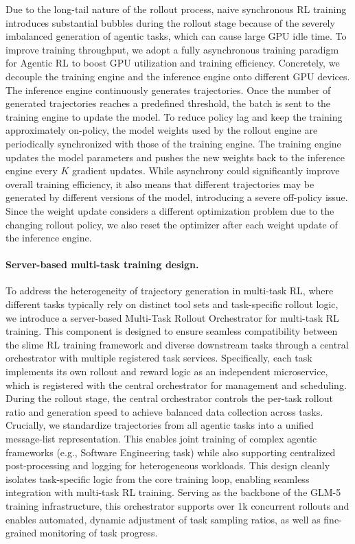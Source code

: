 Due to the long-tail nature of the rollout process, naive synchronous RL training introduces substantial bubbles during the rollout stage because of the severely imbalanced generation of agentic tasks, which can cause large GPU idle time. 
To improve training throughput, we adopt a fully asynchronous training paradigm for Agentic RL to boost GPU utilization and training efficiency.
Concretely, we decouple the training engine and the inference engine onto different GPU devices. 
The inference engine continuously generates trajectories. Once the number of generated trajectories reaches a predefined threshold, the batch is sent to the training engine to update the model.
To reduce policy lag and keep the training approximately on-policy, the model weights used by the rollout engine are periodically synchronized with those of the training engine. The training engine updates the model parameters and pushes the new weights back to the inference engine every $K$ gradient updates.
While asynchrony could significantly improve overall training efficiency, it also means that different trajectories may be generated by different versions of the model, introducing a severe off-policy issue. 
Since the weight update considers a different optimization problem due to the changing
rollout policy, we also reset the optimizer after each weight update of the inference engine.

\paragraph{Server-based multi-task training design.}
To address the heterogeneity of trajectory generation in multi-task RL, where different tasks typically rely on distinct tool sets and task-specific rollout logic, we introduce a server-based Multi-Task Rollout Orchestrator for multi-task RL training.
This component is designed to ensure seamless compatibility between the slime RL training framework and diverse downstream tasks through a central orchestrator with multiple registered task services. Specifically, each task implements its own rollout and reward logic as an independent microservice, which is registered with the central orchestrator for management and scheduling.
During the rollout stage, the central orchestrator controls the per-task rollout ratio and generation speed to achieve balanced data collection across tasks. Crucially, we standardize trajectories from all agentic tasks into a unified message-list representation. This enables joint training of complex agentic frameworks (e.g., Software Engineering task) while also supporting centralized post-processing and logging for heterogeneous workloads. This design cleanly isolates task-specific logic from the core training loop, enabling seamless integration with multi-task RL training.
Serving as the backbone of the GLM-5 training infrastructure, this orchestrator supports over 1k concurrent rollouts and enables automated, dynamic adjustment of task sampling ratios, as well as fine-grained monitoring of task progress.



